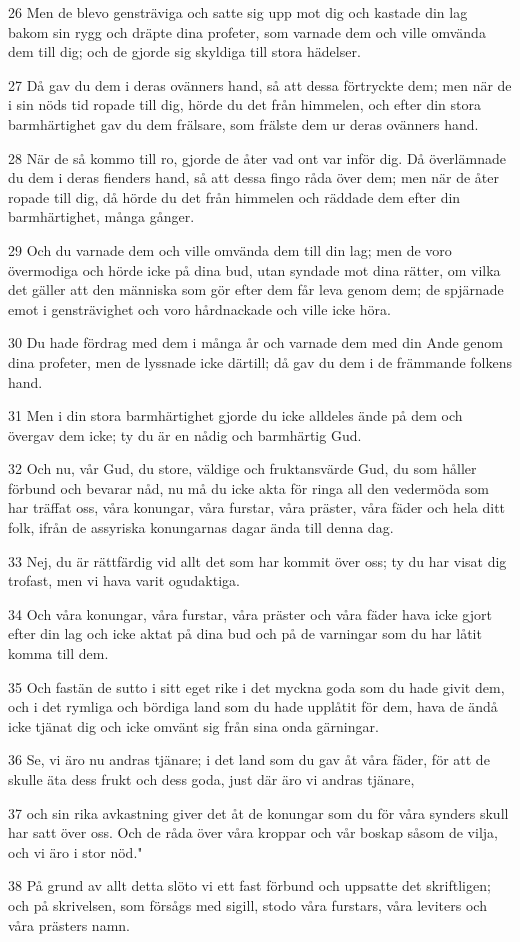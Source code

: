 \par 26 Men de blevo gensträviga och satte sig upp mot dig och kastade din lag bakom sin rygg och dräpte dina profeter, som varnade dem och ville omvända dem till dig; och de gjorde sig skyldiga till stora hädelser.
\par 27 Då gav du dem i deras ovänners hand, så att dessa förtryckte dem; men när de i sin nöds tid ropade till dig, hörde du det från himmelen, och efter din stora barmhärtighet gav du dem frälsare, som frälste dem ur deras ovänners hand.
\par 28 När de så kommo till ro, gjorde de åter vad ont var inför dig. Då överlämnade du dem i deras fienders hand, så att dessa fingo råda över dem; men när de åter ropade till dig, då hörde du det från himmelen och räddade dem efter din barmhärtighet, många gånger.
\par 29 Och du varnade dem och ville omvända dem till din lag; men de voro övermodiga och hörde icke på dina bud, utan syndade mot dina rätter, om vilka det gäller att den människa som gör efter dem får leva genom dem; de spjärnade emot i gensträvighet och voro hårdnackade och ville icke höra.
\par 30 Du hade fördrag med dem i många år och varnade dem med din Ande genom dina profeter, men de lyssnade icke därtill; då gav du dem i de främmande folkens hand.
\par 31 Men i din stora barmhärtighet gjorde du icke alldeles ände på dem och övergav dem icke; ty du är en nådig och barmhärtig Gud.
\par 32 Och nu, vår Gud, du store, väldige och fruktansvärde Gud, du som håller förbund och bevarar nåd, nu må du icke akta för ringa all den vedermöda som har träffat oss, våra konungar, våra furstar, våra präster, våra fäder och hela ditt folk, ifrån de assyriska konungarnas dagar ända till denna dag.
\par 33 Nej, du är rättfärdig vid allt det som har kommit över oss; ty du har visat dig trofast, men vi hava varit ogudaktiga.
\par 34 Och våra konungar, våra furstar, våra präster och våra fäder hava icke gjort efter din lag och icke aktat på dina bud och på de varningar som du har låtit komma till dem.
\par 35 Och fastän de sutto i sitt eget rike i det myckna goda som du hade givit dem, och i det rymliga och bördiga land som du hade upplåtit för dem, hava de ändå icke tjänat dig och icke omvänt sig från sina onda gärningar.
\par 36 Se, vi äro nu andras tjänare; i det land som du gav åt våra fäder, för att de skulle äta dess frukt och dess goda, just där äro vi andras tjänare,
\par 37 och sin rika avkastning giver det åt de konungar som du för våra synders skull har satt över oss. Och de råda över våra kroppar och vår boskap såsom de vilja, och vi äro i stor nöd."
\par 38 På grund av allt detta slöto vi ett fast förbund och uppsatte det skriftligen; och på skrivelsen, som försågs med sigill, stodo våra furstars, våra leviters och våra prästers namn.

